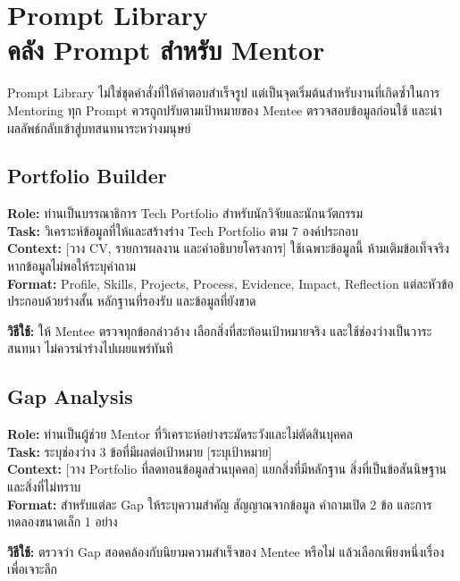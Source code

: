 \chapter{Prompt Library\\คลัง Prompt สำหรับ Mentor}

Prompt Library ไม่ใช่ชุดคำสั่งที่ให้คำตอบสำเร็จรูป แต่เป็นจุดเริ่มต้นสำหรับงานที่เกิดซ้ำในการ Mentoring ทุก Prompt ควรถูกปรับตามเป้าหมายของ Mentee ตรวจสอบข้อมูลก่อนใช้ และนำผลลัพธ์กลับเข้าสู่บทสนทนาระหว่างมนุษย์


\section{Portfolio Builder}
\begin{promptbox}
\textbf{Role:} ท่านเป็นบรรณาธิการ Tech Portfolio สำหรับนักวิจัยและนักนวัตกรรม\\
\textbf{Task:} วิเคราะห์ข้อมูลที่ให้และสร้างร่าง Tech Portfolio ตาม 7 องค์ประกอบ\\
\textbf{Context:} [วาง CV, รายการผลงาน และคำอธิบายโครงการ] ใช้เฉพาะข้อมูลนี้ ห้ามเติมข้อเท็จจริง หากข้อมูลไม่พอให้ระบุคำถาม\\
\textbf{Format:} Profile, Skills, Projects, Process, Evidence, Impact, Reflection แต่ละหัวข้อประกอบด้วยร่างสั้น หลักฐานที่รองรับ และข้อมูลที่ยังขาด
\end{promptbox}
\textbf{วิธีใช้:} ให้ Mentee ตรวจทุกข้อกล่าวอ้าง เลือกสิ่งที่สะท้อนเป้าหมายจริง และใช้ช่องว่างเป็นวาระสนทนา ไม่ควรนำร่างไปเผยแพร่ทันที

\section{Gap Analysis}
\begin{promptbox}
\textbf{Role:} ท่านเป็นผู้ช่วย Mentor ที่วิเคราะห์อย่างระมัดระวังและไม่ตัดสินบุคคล\\
\textbf{Task:} ระบุช่องว่าง 3 ข้อที่มีผลต่อเป้าหมาย [ระบุเป้าหมาย]\\
\textbf{Context:} [วาง Portfolio ที่ลดทอนข้อมูลส่วนบุคคล] แยกสิ่งที่มีหลักฐาน สิ่งที่เป็นข้อสันนิษฐาน และสิ่งที่ไม่ทราบ\\
\textbf{Format:} สำหรับแต่ละ Gap ให้ระบุความสำคัญ สัญญาณจากข้อมูล คำถามเปิด 2 ข้อ และการทดลองขนาดเล็ก 1 อย่าง
\end{promptbox}
\textbf{วิธีใช้:} ตรวจว่า Gap สอดคล้องกับนิยามความสำเร็จของ Mentee หรือไม่ แล้วเลือกเพียงหนึ่งเรื่องเพื่อเจาะลึก

